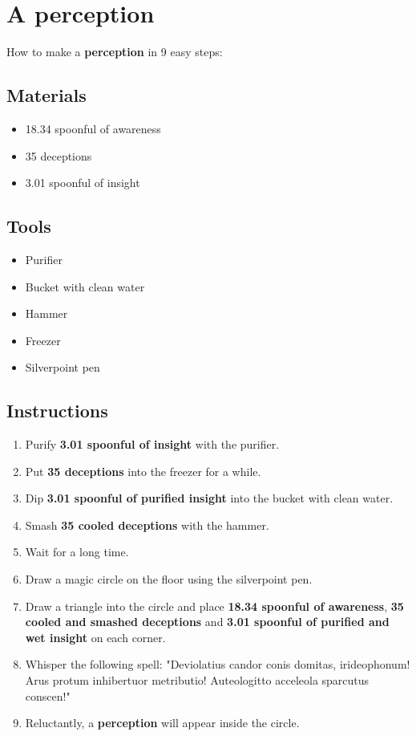 \documentclass{article}
\begin{document}
\section{A perception}How to make a \textbf{perception} in 9 easy steps:

\subsection{Materials}\begin{itemize}
\item 
18.34 spoonful of awareness
\item 
35 deceptions
\item 
3.01 spoonful of insight
\end{itemize}
\subsection{Tools}\begin{itemize}
\item 
Purifier
\item 
Bucket with clean water
\item 
Hammer
\item 
Freezer
\item 
Silverpoint pen
\end{itemize}
\subsection{Instructions}\begin{enumerate}
\item 
Purify \textbf{3.01 spoonful of insight} with the purifier.
\item 
Put \textbf{35 deceptions} into the freezer for a while.
\item 
Dip \textbf{3.01 spoonful of purified insight} into the bucket with clean water.
\item 
Smash \textbf{35 cooled deceptions} with the hammer.
\item 
Wait for a long time.
\item 
Draw a magic circle on the floor using the silverpoint pen.
\item 
Draw a triangle into the circle and place \textbf{18.34 spoonful of awareness}, \textbf{35 cooled and smashed deceptions} and \textbf{3.01 spoonful of purified and wet insight} on each corner.
\item 
Whisper the following spell: "Deviolatius candor conis domitas, irideophonum! Arus protum inhibertuor metributio! Auteologitto acceleola sparcutus conscen!"
\item 
Reluctantly, a \textbf{perception} will appear inside the circle.
\end{enumerate}
\newpage
\end{document}
